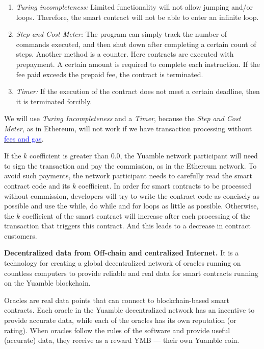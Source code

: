 \documentclass[11pt]{article}
\begin{document}
\begin{multicols}{2}
\begin{enumerate}
\item \textit{Turing incompleteness:} Limited functionality will not allow jumping and/or loops. Therefore, the smart contract will not be able to enter an infinite loop.

\item \textit{Step and Cost Meter:} The program can simply track the number of commands executed, and then shut down after completing a certain count of steps. Another method is a counter. Here contracts are executed with prepayment. A certain amount is required to complete each instruction. If the fee paid exceeds the prepaid fee, the contract is terminated.

\item \textit{Timer:} If the execution of the contract does not meet a certain deadline, then it is terminated forcibly.

\end{enumerate}

We will use \textit{Turing Incompleteness} and a \textit{Timer}, because the \textit{Step and Cost Meter}, as in Ethereum, will not work if we have transaction processing without \href{https://ethereum.org/en/developers/docs/gas/}{\textcolor{blue}{fees and gas}}.

If the $k$ coefficient is greater than 0.0, the Yuamble network participant will need to sign the transaction and pay the commission, as in the Ethereum network. To avoid such payments, the network participant needs to carefully read the smart contract code and its $k$ coefficient. In order for smart contracts to be processed without commission, developers will try to write the contract code as concisely as possible and use the while, do while and for loops as little as possible. Otherwise, the $k$ coefficient of the smart contract will increase after each processing of the transaction that triggers this contract. And this leads to a decrease in contract customers.

\vspace{1\baselineskip}
\textbf{Decentralized data from Off-chain and centralized Internet.} It is a technology for creating a global decentralized network of oracles running on countless computers to provide reliable and real data for smart contracts running on the Yuamble blockchain.

Oracles are real data points that can connect to blockchain-based smart contracts. Each oracle in the Yuamble decentralized network has an incentive to provide accurate data, while each of the oracles has its own reputation (or rating). When oracles follow the rules of the software and provide useful (accurate) data, they receive as a reward YMB — their own Yuamble coin.


\end{multicols}
\end{document}
